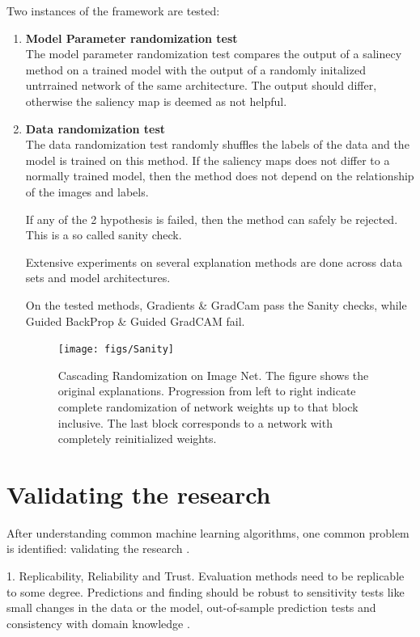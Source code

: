 Two instances of the framework are tested:

\begin{enumerate}
	\item \textbf{Model Parameter randomization test}\\
		The model parameter randomization test compares the output of a salinecy method on a trained model with the output of a randomly initalized untrrained network of the same architecture. The output should differ, otherwise the saliency map is deemed as not helpful.
	\item \textbf{Data randomization test}\\
		The data randomization test randomly shuffles the labels of the data and the model is trained on this method. If the saliency maps does not differ to a normally trained model, then the method does not depend on the relationship of the images and labels.

If any of the 2 hypothesis is failed, then the method can safely be rejected. This is a so called sanity check.

Extensive experiments on several explanation methods are done across data sets and model architectures. 

On the tested methods, Gradients \& GradCam pass the Sanity checks, while Guided BackProp \& Guided GradCAM fail.

\begin{figure}[h!]
	\centering
	\texttt{[image: figs/Sanity]}
	\caption{Cascading Randomization on Image Net. The figure shows the original explanations. Progression from left to right indicate complete randomization of network weights up to that block inclusive. The last block corresponds to a network with completely reinitialized weights.\cite{adebayo2020sanity}}
	\label{fig:Sanity}
\end{figure}


\end{enumerate}



\section{Validating the research}

After understanding common machine learning algorithms, one common problem is identified: validating the research \cite{allen2023interpretable}.

1. Replicability, Reliability and Trust. Evaluation methods need to be replicable to some degree. Predictions and finding should be robust to sensitivity tests like small changes in the data or the model, out-of-sample prediction tests and consistency with domain knowledge \cite{Meng2020Reproducibility}.

